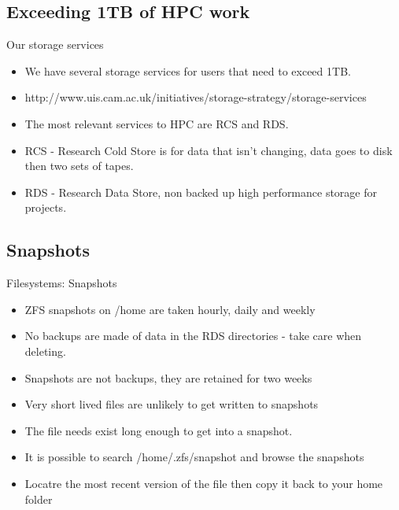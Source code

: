 \subsection{Exceeding 1TB of HPC work}
\begin{frame}{Our storage services}
\begin{itemize}
\item{We have several storage services for users that need to exceed 1TB.}
\pause
\item{\alert{http://www.uis.cam.ac.uk/initiatives/storage-strategy/storage-services}}
\item{The most relevant services to HPC are RCS and RDS.}
\item{RCS - Research Cold Store is for data that isn't changing, data goes to disk then two sets of tapes.}
\item{RDS - Research Data Store, non backed up high performance storage for projects.}
\end{itemize}
\end{frame}

\subsection{Snapshots}
\begin{frame}{Filesystems: Snapshots}
\begin{itemize}
\item<1->{ZFS snapshots on /home are taken hourly, daily and weekly}
\item<2->{{\color{red}No backups are made of data in the RDS directories - take care when deleting.}}
\item<3->{Snapshots are not backups, they are retained for two weeks}
\item<4->{\color{red}Very short lived files are unlikely to get written to snapshots}
\item{The file needs exist long enough to get into a snapshot.}
\item{It is possible to search /home/.zfs/snapshot and browse the snapshots}
\item {Locatre the most recent version of the file then copy it back to your home folder} 
\end{itemize}
\end{frame}

